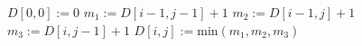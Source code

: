 \begin{algorithmic}[1]
        \State $D[0,0]:=0$
                \State $m_1 := D[i-1, j-1] + 1$
                \State $m_2 := D[i-1, j] + 1$
                \State $m_3 := D[i, j-1] + 1$
                \State $D[i,j] := \textrm{min}(m_1, m_2, m_3)$
            \EndFor
        \EndFor
        \State {}
    \EndFunction
\end{algorithmic}